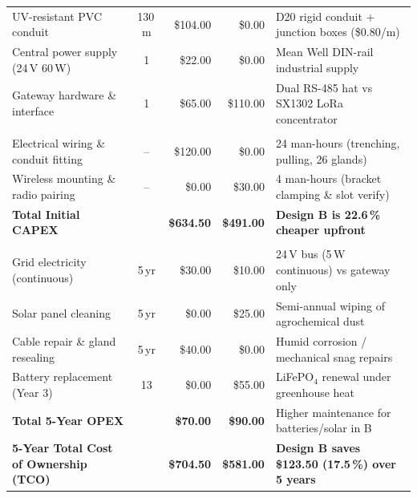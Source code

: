 \documentclass[11pt,a4paper]{report}
\begin{document}
\begin{table}[!htbp]
\begin{tabularx}{\textwidth}{>{\raggedright\arraybackslash}p{4.0cm} c r r Y}
UV-resistant PVC conduit & 130\,m & \$104.00 & \$0.00 & D20 rigid conduit + junction boxes (\$0.80/m)\\
Central power supply (24\,V 60\,W) & 1 & \$22.00 & \$0.00 & Mean Well DIN-rail industrial supply\\
Gateway hardware \& interface & 1 & \$65.00 & \$110.00 & Dual RS-485 hat vs SX1302 LoRa concentrator\\
\midrule
{}\\
Electrical wiring \& conduit fitting & -- & \$120.00 & \$0.00 & 24 man-hours (trenching, pulling, 26 glands)\\
Wireless mounting \& radio pairing & -- & \$0.00 & \$30.00 & 4 man-hours (bracket clamping \& slot verify)\\
\midrule
\textbf{Total Initial CAPEX} & & \textbf{\$634.50} & \textbf{\$491.00} & \textbf{Design B is 22.6\,\% cheaper upfront}\\
\midrule
{}\\
Grid electricity (continuous) & 5\,yr & \$30.00 & \$10.00 & 24\,V bus (5\,W continuous) vs gateway only\\
Solar panel cleaning & 5\,yr & \$0.00 & \$25.00 & Semi-annual wiping of agrochemical dust\\
Cable repair \& gland resealing & 5\,yr & \$40.00 & \$0.00 & Humid corrosion / mechanical snag repairs\\
Battery replacement (Year 3) & 13 & \$0.00 & \$55.00 & LiFePO$_4$ renewal under greenhouse heat\\
\midrule
\textbf{Total 5-Year OPEX} & & \textbf{\$70.00} & \textbf{\$90.00} & Higher maintenance for batteries/solar in B\\
\midrule
\textbf{5-Year Total Cost of Ownership (TCO)} & & \textbf{\$704.50} & \textbf{\$581.00} & \textbf{Design B saves \$123.50 (17.5\,\%) over 5 years}\\
\bottomrule
\end{tabularx}
\end{table}
\end{document}
